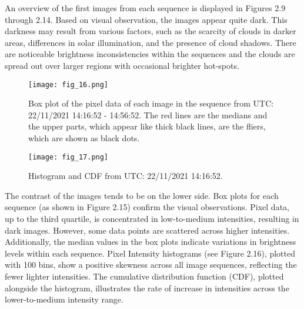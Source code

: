 An overview of the first images from each sequence is displayed in Figures 2.9 through 2.14.
Based on visual observation, the images appear quite dark. This darkness may result from various factors, such as the scarcity of clouds in darker areas, differences in solar illumination, and the presence of cloud shadows.
There are noticeable brightness inconsistencies within the sequences and the clouds are spread out over larger regions with occasional brighter hot-spots. 
\FloatBarrier
\begin{figure}[h!]
    \centering
    \texttt{[image: fig\_16.png]}
    \caption{Box plot of the pixel data of each image in the sequence from UTC: 22/11/2021 14:16:52 - 14:56:52. The red lines are the medians and the upper parts, which appear like thick black lines, are the fliers, which are shown as black dots. }
\end{figure}
\FloatBarrier
\begin{figure}[h!]
    \centering
    \texttt{[image: fig\_17.png]}
    \caption{Histogram and CDF from UTC: 22/11/2021 14:16:52.}
\end{figure}
\FloatBarrier
The contrast of the images tends to be on the lower side. Box plots for each sequence (as shown in Figure 2.15) confirm the visual observations. Pixel data, up to the third quartile, is concentrated in low-to-medium intensities, resulting in dark images. However, some data points are scattered across higher intensities. Additionally, the median values in the box plots indicate variations in brightness levels within each sequence. Pixel Intensity histograms (see Figure 2.16), plotted with 100 bins, show a positive skewness across all image sequences, reflecting the fewer lighter intensities. The cumulative distribution function (CDF), plotted alongside the histogram, illustrates the rate of increase in intensities across the lower-to-medium intensity range.

